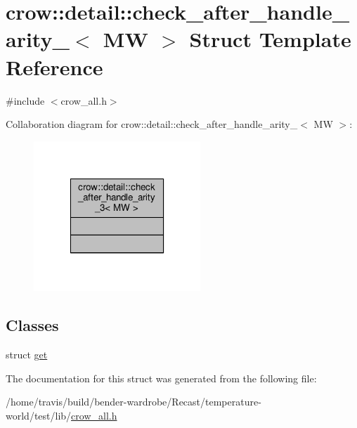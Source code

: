 \hypertarget{structcrow_1_1detail_1_1check__after__handle__arity__3}{\section{crow\-:\-:detail\-:\-:check\-\_\-after\-\_\-handle\-\_\-arity\-\_$<$ M\-W $>$ Struct Template Reference}
\label{structcrow_1_1detail_1_1check__after__handle__arity__3}
}


{\ttfamily \#include $<$crow\-\_\-all.\-h$>$}



Collaboration diagram for crow\-:\-:detail\-:\-:check\-\_\-after\-\_\-handle\-\_\-arity\-\_$<$ M\-W $>$\-:
\nopagebreak
\begin{figure}[H]
\begin{center}
\leavevmode
\includegraphics[width=178pt]{structcrow_1_1detail_1_1check__after__handle__arity__3__coll__graph}
\end{center}
\end{figure}
\subsection*{Classes}
\begin{DoxyCompactItemize}
\item 
struct \hyperlink{structcrow_1_1detail_1_1check__after__handle__arity__3_1_1get}{get}
\end{DoxyCompactItemize}


The documentation for this struct was generated from the following file\-:\begin{DoxyCompactItemize}
\item 
/home/travis/build/bender-\/wardrobe/\-Recast/temperature-\/world/test/lib/\hyperlink{crow__all_8h}{crow\-\_\-all.\-h}\end{DoxyCompactItemize}
